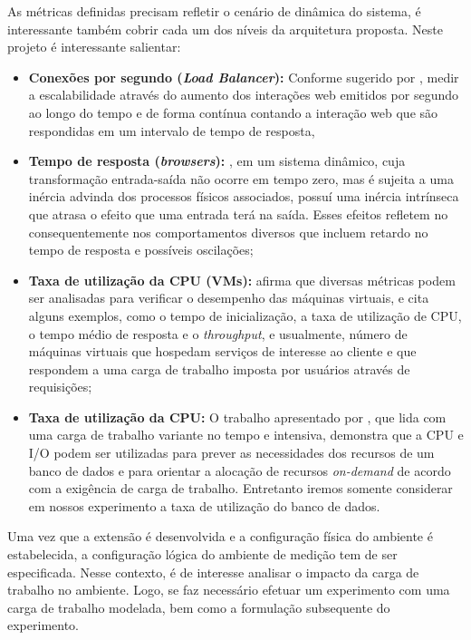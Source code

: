As métricas definidas precisam refletir o cenário de dinâmica do sistema, é interessante também cobrir cada um dos níveis da arquitetura proposta. Neste projeto é interessante salientar:
\begin{itemize}
	\item \textbf{Conexões por segundo (\textit{Load Balancer}):} Conforme sugerido por , medir a escalabilidade através do aumento dos interações web emitidos por segundo ao longo do tempo e de forma contínua contando a interação web que são respondidas em um intervalo de tempo de resposta,
	
	\item \textbf{Tempo de resposta (\textit{browsers}):} , em um sistema dinâmico, cuja transformação entrada-saída não ocorre em tempo zero, mas é sujeita a uma inércia advinda dos processos físicos associados, possuí uma inércia intrínseca que atrasa o efeito que uma entrada terá na saída. Esses efeitos refletem no consequentemente nos comportamentos diversos que incluem retardo no tempo de resposta e possíveis oscilações; 
	
	\item \textbf{Taxa de utilização da CPU (VMs):}  afirma que diversas métricas podem ser analisadas para verificar o desempenho das máquinas virtuais, e cita alguns exemplos, como o tempo de inicialização, a taxa de utilização de CPU, o tempo médio de resposta e o \textit{throughput}, e usualmente, número de máquinas virtuais que hospedam serviços de interesse ao cliente e que respondem a uma carga de trabalho imposta por usuários através de requisições;

	\item \textbf{Taxa de utilização da CPU:} O trabalho apresentado por , que lida com uma carga de trabalho variante no tempo e intensiva, demonstra que a CPU e I/O podem ser utilizadas para prever as necessidades dos recursos de um banco de dados e para orientar a alocação de recursos \textit{on-demand} de acordo com a exigência de carga de trabalho. Entretanto iremos somente considerar em nossos experimento a taxa de utilização do banco de dados.
\end{itemize}


Uma vez que a extensão é desenvolvida e a configuração física do ambiente é estabelecida, a configuração lógica do ambiente de medição tem de ser especificada. Nesse contexto, é de interesse analisar o impacto da carga de trabalho no ambiente. Logo, se faz necessário efetuar um experimento com uma carga de trabalho modelada, bem como a formulação subsequente do experimento. 

